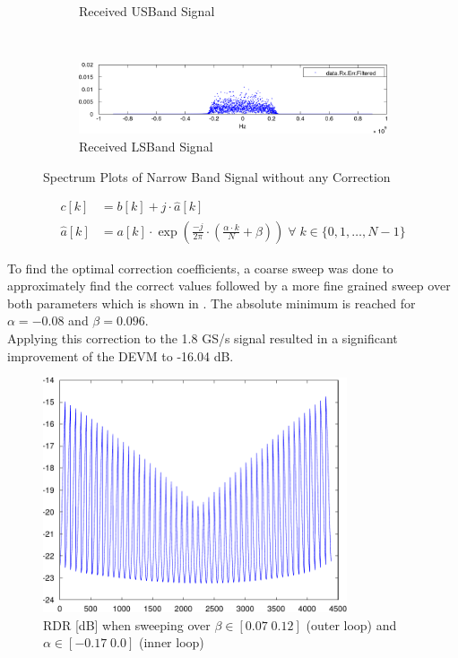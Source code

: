 \begin{figure}[p]
\begin{subfigure}{\textwidth}
    \caption{Received \gls{USBand} Signal}
    \label{fig:res_450_freq_uncorr_rx_usb}
  \end{subfigure}
  \vspace{4ex} \\
  \begin{subfigure}{\textwidth}
    \centering
    \includegraphics[width=\textwidth]{figures/matlab/res_450_freq_uncorr_rx_lsb}
    \caption{Received \gls{LSBand} Signal}
    \label{fig:res_450_freq_uncorr_rx_lsb}
  \end{subfigure}
  \caption{Spectrum Plots of Narrow Band Signal without any Correction}
  \label{fig:res_450_freq_uncorr}
\end{figure}

\begin{align}
  c[k] &= b[k] + j \cdot \hat a[k] \\
  \hat a[k] &= a[k]  \cdot \exp\left(
  \frac{-j}{2 \pi} \cdot \left(\frac{\alpha \cdot k}{N} + \beta\right)
  \right) \;\forall\; k \in \{0, 1, \dots,  N-1\}
  \label{eq:res_1350_a_hat}
\end{align}

To find the optimal correction coefficients, a coarse sweep was done to approximately
find the correct values followed by a more fine grained sweep over both parameters
which is shown in .
The absolute minimum is reached for $\alpha = -0.08$ and $\beta = 0.096$. \\

Applying this correction to the 1.8 GS/s signal resulted in a significant
improvement of the \gls{DEVM} to -16.04 dB.

\begin{figure}[p]
  \centering
  \includegraphics[width=0.8\textwidth]{figures/matlab/res_1350_ab_sweep}
  \caption{\gls{RDR} [dB] when sweeping over $\beta \in [0.07 \; 0.12]$
    (outer loop) and $\alpha \in [-0.17 \; 0.0]$ (inner loop)}
  \label{fig:res_1350_ab_sweep}
\end{figure}

